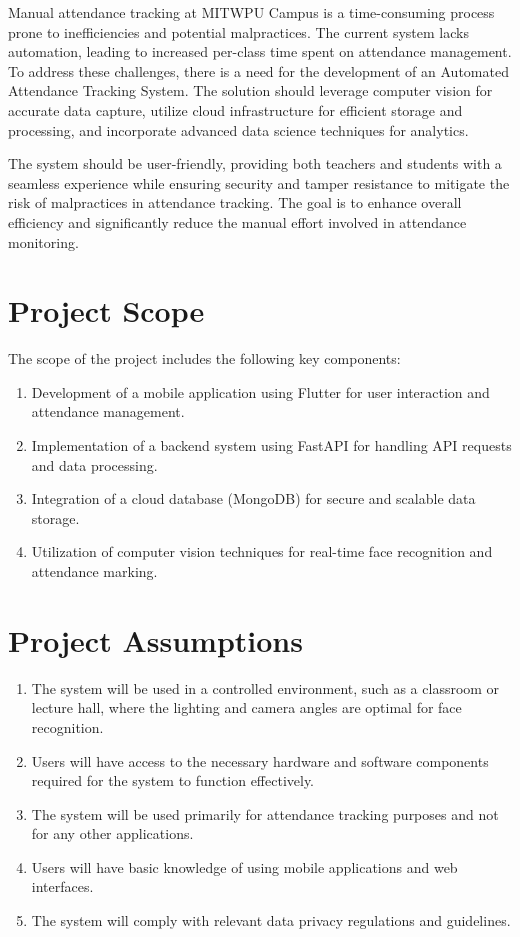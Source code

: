 \documentclass[openany]{report}
\begin{document}
Manual attendance tracking at MITWPU Campus is a time-consuming process prone to inefficiencies and potential malpractices. The current system lacks automation, leading to increased per-class time spent on attendance management.
	\vspace*{0.5cm}
	To address these challenges, there is a need for the development of an Automated Attendance Tracking System. The solution should leverage computer vision for accurate data capture, utilize cloud infrastructure for efficient storage and processing, and incorporate advanced data science techniques for analytics.

	\vspace*{0.5cm}
	The system should be user-friendly, providing both teachers and students with a seamless experience while ensuring security and tamper resistance to mitigate the risk of malpractices in attendance tracking. The goal is to enhance overall efficiency and significantly reduce the manual effort involved in attendance monitoring.

\section{Project Scope}

The scope of the project includes the following key components:

\begin{enumerate}
    \item Development of a mobile application using Flutter for user interaction and attendance management.
    \item Implementation of a backend system using FastAPI for handling API requests and data processing.
    \item Integration of a cloud database (MongoDB) for secure and scalable data storage.
    \item Utilization of computer vision techniques for real-time face recognition and attendance marking.
\end{enumerate}

\section{Project Assumptions}

\begin{enumerate}
    \item The system will be used in a controlled environment, such as a classroom or lecture hall, where the lighting and camera angles are optimal for face recognition.
    \item Users will have access to the necessary hardware and software components required for the system to function effectively.
    \item The system will be used primarily for attendance tracking purposes and not for any other applications.
    \item Users will have basic knowledge of using mobile applications and web interfaces.
    \item The system will comply with relevant data privacy regulations and guidelines.
    
\end{enumerate}
\end{document}
